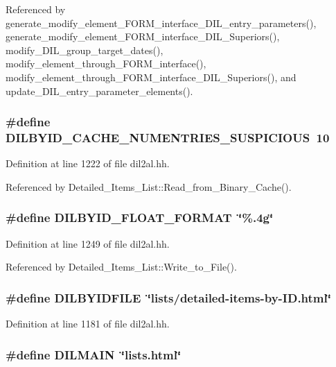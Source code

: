 Referenced by generate\_\-modify\_\-element\_\-FORM\_\-interface\_\-DIL\_\-entry\_\-parameters(), generate\_\-modify\_\-element\_\-FORM\_\-interface\_\-DIL\_\-Superiors(), modify\_\-DIL\_\-group\_\-target\_\-dates(), modify\_\-element\_\-through\_\-FORM\_\-interface(), modify\_\-element\_\-through\_\-FORM\_\-interface\_\-DIL\_\-Superiors(), and update\_\-DIL\_\-entry\_\-parameter\_\-elements().
\subsubsection{\setlength{\rightskip}{0pt plus 5cm}\#define DILBYID\_\-CACHE\_\-NUMENTRIES\_\-SUSPICIOUS\ 10}\label{dil2al_8hh_a75}




Definition at line 1222 of file dil2al.hh.

Referenced by Detailed\_\-Items\_\-List::Read\_\-from\_\-Binary\_\-Cache().
\subsubsection{\setlength{\rightskip}{0pt plus 5cm}\#define DILBYID\_\-FLOAT\_\-FORMAT\ \char`\"{}\%.4g\char`\"{}}\label{dil2al_8hh_a95}




Definition at line 1249 of file dil2al.hh.

Referenced by Detailed\_\-Items\_\-List::Write\_\-to\_\-File().
\subsubsection{\setlength{\rightskip}{0pt plus 5cm}\#define DILBYIDFILE\ \char`\"{}lists/detailed-items-by-ID.html\char`\"{}}\label{dil2al_8hh_a35}




Definition at line 1181 of file dil2al.hh.
\subsubsection{\setlength{\rightskip}{0pt plus 5cm}\#define DILMAIN\ \char`\"{}lists.html\char`\"{}}\label{dil2al_8hh_a33}




